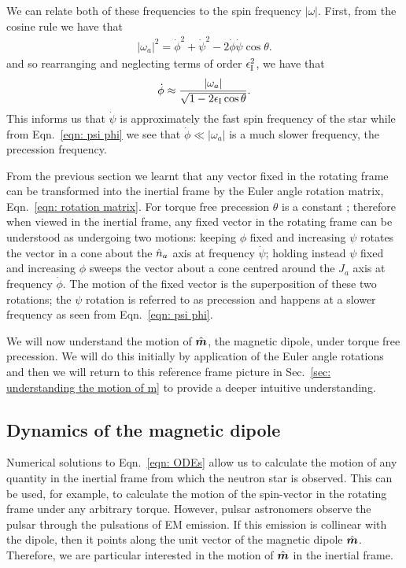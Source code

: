 \documentclass[../full_thesis/full_thesis.tex]{subfiles}
\begin{document}
We can relate both of these frequencies to the spin frequency $|\omega|$.
First, from the cosine rule we have that
\begin{align}
|\omega_a|^{2} = \dot{\phi}^{2}+\dot{\psi}^{2} - 2\dot{\phi}\dot{\psi}\cos\theta.
\end{align}
and so rearranging and neglecting terms of order $\epsilon_{\mathrm{I}}^{2}$, we have that
\begin{align}
\dot{\phi} \approx \frac{|\omega_a|}{\sqrt{1- 2\epsilon_{\mathrm{I}}\cos\theta}}.
\label{eqn: phi dot}
\end{align}
This informs us that $\dot{\psi}$ is approximately the fast spin frequency
of the star while from Eqn.~\eqref{eqn: psi phi} we see that $\dot{\phi} \ll |\omega_a|$
is a much slower frequency, the precession frequency.

From the previous section we learnt that any vector fixed in the rotating frame
can be transformed into the inertial frame by the Euler angle rotation matrix,
Eqn.~\eqref{eqn: rotation matrix}. For torque free precession $\theta$ is a
constant \citep{Landau1969}; therefore when viewed in the inertial frame, any
fixed vector in the rotating frame can be understood as undergoing two motions:
keeping $\phi$ fixed and increasing $\psi$ rotates the vector in a cone
about the $\hat{n}_{a}$ axis at frequency $\dot{\psi}$; holding
instead $\psi$ fixed and increasing $\phi$ sweeps the vector about a cone
centred around the $\hat{J}_a$ axis at frequency
$\dot{\phi}$. The motion of the fixed vector is the superposition of these two
rotations; the $\psi$ rotation is referred to as precession and happens at a
slower frequency as seen from Eqn.~\eqref{eqn: psi phi}.

We will now understand the motion of $\hat{\boldsymbol{m}}$, the magnetic dipole, under torque
free precession. We will do this initially by application of the Euler angle
rotations and then we will return to this reference frame picture in
Sec.~\ref{sec: understanding the motion of m} to provide a deeper intuitive
understanding.

\subsection{Dynamics of the magnetic dipole}

Numerical solutions to Eqn.~\eqref{eqn: ODEs} allow us to calculate the motion
of any quantity in the inertial frame from which the neutron star is observed.
This can be used, for example, to calculate the motion of the spin-vector in the
rotating frame under any arbitrary torque. However, pulsar astronomers observe the pulsar
through the pulsations of EM emission. If this emission is collinear with the
dipole, then it points along the unit vector of the magnetic dipole $\hat{\boldsymbol{m}}$. Therefore,
we are particular interested in the motion of $\hat{\boldsymbol{m}}$ in the inertial frame.
\end{document}
